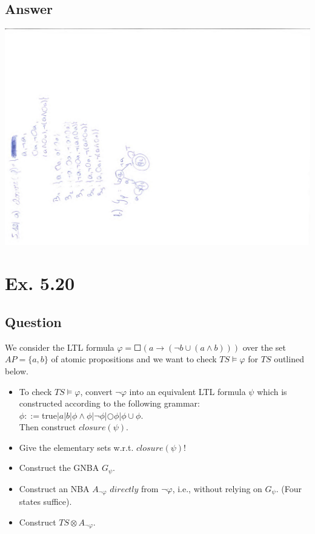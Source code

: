 \documentclass[12pt]{article}
\begin{document}
\subsection*{Answer}
\includegraphics*[angle=270, scale=0.7]{ex518.pdf}

\newpage
\section*{Ex. 5.20}
\subsection*{Question}
We consider the LTL formula $\varphi = \Square(a\rightarrow(\neg b\cup(a\wedge b)))$ over the set $AP = \{a,b\}$ of atomic propositions and we want to check $TS \models \varphi$ for $TS$ outlined below.

\begin{itemize}
	\item To check $TS \models \varphi$, convert $\neg\varphi$ into an equivalent LTL formula $\psi$ which is constructed according to the following grammar:\\
	$\phi ::= $true$|a|b|\phi\wedge\phi|\neg\phi|\Circle\phi|\phi\cup\phi$.\\
	Then construct $closure(\psi)$.
	\item Give the elementary sets w.r.t. $closure(\psi)$!
	\item Construct the GNBA $G_\psi$.
	\item Construct an NBA $A_{\neg\varphi}$ $directly$ from $\neg\varphi$, i.e., without relying on $G_\psi$. (Four states suffice).
	\item Construct $TS \otimes A_{\neg\varphi}$.
\end{itemize}
\end{document}
